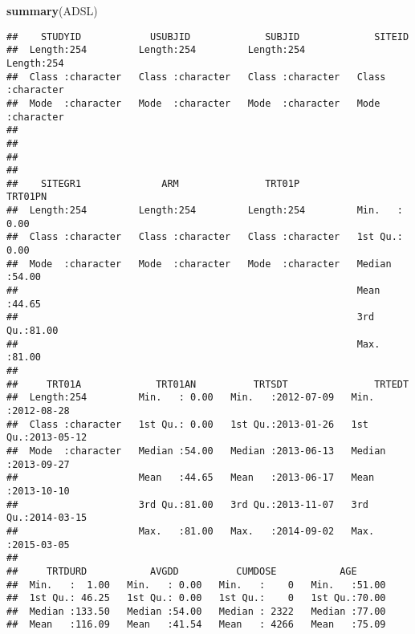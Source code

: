 \documentclass[]{book}
\newenvironment{Shaded}{\begin{snugshade}}{\end{snugshade}}
\newcommand{\KeywordTok}[1]{\textcolor[rgb]{0.13,0.29,0.53}{\textbf{#1}}}
\newcommand{\NormalTok}[1]{#1}
\begin{document}
\begin{Shaded}
\begin{Highlighting}[]
\KeywordTok{summary}\NormalTok{(ADSL)}
\end{Highlighting}
\end{Shaded}

\begin{verbatim}
##    STUDYID            USUBJID             SUBJID             SITEID         
##  Length:254         Length:254         Length:254         Length:254        
##  Class :character   Class :character   Class :character   Class :character  
##  Mode  :character   Mode  :character   Mode  :character   Mode  :character  
##                                                                             
##                                                                             
##                                                                             
##                                                                             
##    SITEGR1              ARM               TRT01P             TRT01PN     
##  Length:254         Length:254         Length:254         Min.   : 0.00  
##  Class :character   Class :character   Class :character   1st Qu.: 0.00  
##  Mode  :character   Mode  :character   Mode  :character   Median :54.00  
##                                                           Mean   :44.65  
##                                                           3rd Qu.:81.00  
##                                                           Max.   :81.00  
##                                                                          
##     TRT01A             TRT01AN          TRTSDT               TRTEDT          
##  Length:254         Min.   : 0.00   Min.   :2012-07-09   Min.   :2012-08-28  
##  Class :character   1st Qu.: 0.00   1st Qu.:2013-01-26   1st Qu.:2013-05-12  
##  Mode  :character   Median :54.00   Median :2013-06-13   Median :2013-09-27  
##                     Mean   :44.65   Mean   :2013-06-17   Mean   :2013-10-10  
##                     3rd Qu.:81.00   3rd Qu.:2013-11-07   3rd Qu.:2014-03-15  
##                     Max.   :81.00   Max.   :2014-09-02   Max.   :2015-03-05  
##                                                                              
##     TRTDURD           AVGDD          CUMDOSE           AGE       
##  Min.   :  1.00   Min.   : 0.00   Min.   :    0   Min.   :51.00  
##  1st Qu.: 46.25   1st Qu.: 0.00   1st Qu.:    0   1st Qu.:70.00  
##  Median :133.50   Median :54.00   Median : 2322   Median :77.00  
##  Mean   :116.09   Mean   :41.54   Mean   : 4266   Mean   :75.09  

\end{verbatim}
\end{document}
